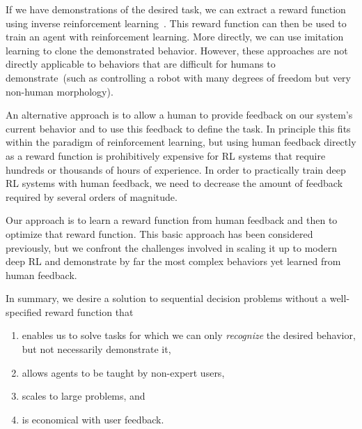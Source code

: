 \documentclass{article}
\begin{document}
If we have demonstrations of the desired task,
we can extract a reward function using inverse reinforcement learning~\citep{Ng00}.
This reward function can then be used to train an agent with reinforcement learning.
More directly, we can use imitation learning
to clone the demonstrated behavior.
However, these approaches are not directly applicable
to behaviors that are difficult for humans to demonstrate~(such as controlling a robot with many degrees of freedom but very non-human morphology).

An alternative approach is to allow a human to provide feedback
on our system's current behavior and to use this feedback to define the task.
In principle this fits within the paradigm of reinforcement learning,
but using human feedback directly as a reward function
is prohibitively expensive for RL systems that require hundreds or thousands of hours of experience.
In order to practically train deep RL systems with human feedback,
we need to decrease the amount of feedback required by several orders of magnitude.
 
Our approach is to learn a reward function from human feedback
and then to optimize that reward function.
This basic approach has been considered previously,
but we confront the challenges involved in scaling it up to modern deep RL
and demonstrate by far the most complex behaviors yet learned from human feedback.

In summary, we desire a solution to sequential decision problems
without a well-specified reward function that
\begin{enumerate}
\item enables us to solve tasks for which we can only \emph{recognize} the desired behavior,
    but not necessarily demonstrate it,
\item allows agents to be taught by non-expert users,
\item scales to large problems, and
\item is economical with user feedback.
\end{enumerate}
\end{document}
